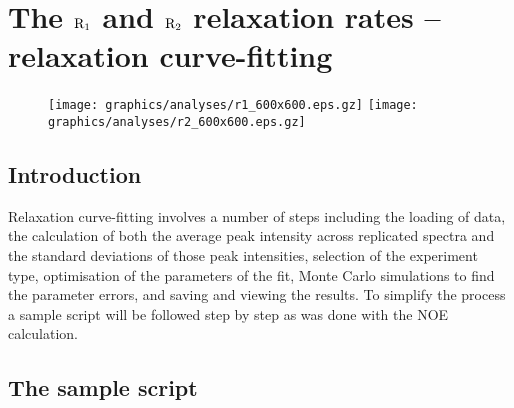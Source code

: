 
\chapter[Relaxation curve-fitting]{The $\mathrm{R}_1$ and $\mathrm{R}_2$ relaxation rates -- relaxation curve-fitting}


\begin{figure*}[h]
\texttt{[image: graphics/analyses/r1\_600x600.eps.gz]} \hfill \texttt{[image: graphics/analyses/r2\_600x600.eps.gz]}
\end{figure*}



\section{Introduction}

Relaxation curve-fitting involves a number of steps including the loading of data, the calculation of both the average peak intensity across replicated spectra and the standard deviations of those peak intensities, selection of the experiment type, optimisation of the parameters of the fit, Monte Carlo simulations to find the parameter errors, and saving and viewing the results.  To simplify the process a sample script will be followed step by step as was done with the NOE calculation.




\section{The sample script}

